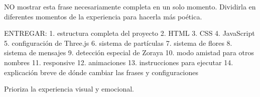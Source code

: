 NO mostrar esta frase necesariamente completa en un solo momento.
Dividirla en diferentes momentos de la experiencia para hacerla más poética.

ENTREGAR:
1. estructura completa del proyecto
2. HTML
3. CSS
4. JavaScript
5. configuración de Three.js
6. sistema de partículas
7. sistema de flores
8. sistema de mensajes
9. detección especial de Zoraya
10. modo amistad para otros nombres
11. responsive
12. animaciones
13. instrucciones para ejecutar
14. explicación breve de dónde cambiar las frases y configuraciones

Prioriza la experiencia visual y emocional.